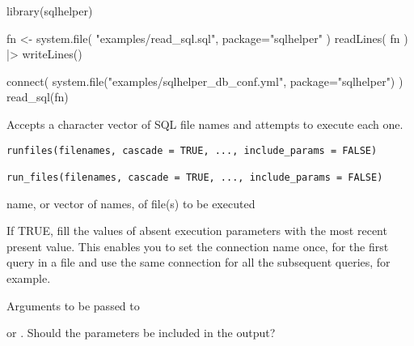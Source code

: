\documentclass[a4paper]{book}
\begin{document}
%
\begin{Examples}
\begin{ExampleCode}

library(sqlhelper)

fn <- system.file( "examples/read_sql.sql", package="sqlhelper" )
readLines( fn ) |> writeLines()

connect( system.file("examples/sqlhelper_db_conf.yml", package="sqlhelper") )
read_sql(fn)

\end{ExampleCode}
\end{Examples}
%
\begin{Description}\relax
Accepts a character vector of SQL file names and attempts to execute each one.
\end{Description}
%
\begin{Usage}
\begin{verbatim}
runfiles(filenames, cascade = TRUE, ..., include_params = FALSE)

run_files(filenames, cascade = TRUE, ..., include_params = FALSE)
\end{verbatim}
\end{Usage}
%
\begin{Arguments}
\begin{ldescription}
\item[\code{filenames}] name, or vector of names, of file(s) to be executed

\item[\code{cascade}] If TRUE, fill the values of absent execution parameters with
the most recent present value. This enables you to set the connection name
once, for the first query in a file and use the same connection for all the
subsequent queries, for example.

\item[\code{...}] Arguments to be passed to 

\item[\code{include\_params}]  or . Should the parameters be
included in the output?
\end{ldescription}
\end{Arguments}
%
\end{document}

